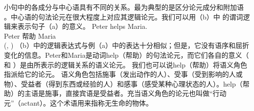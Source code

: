 小句中的各成分与中心语具有不同的关系。最为典型的是区分论元成分和附加语
。中心语的句法论元在很大程度上对应其逻辑论元。我们可以用（b）中
的谓词逻辑来表示句子（a）的意义。
\eal
\ex 
\gll Peter helps Maria.\\
     Peter 帮助 Maria\\
\ex {}(, )
\zl
（b）中的逻辑表达式与例（a）中的表达十分相似；但是，它没有语序和屈折变化的信息。Peter和Maria是动词help（帮助）的句法论元，而它们各自的意义（ 和 ）是由所表示的逻辑关系的语义论元。
我们也可以说help（帮助）将语义角色指派给它的论元。
语义角色包括施事（发出动作的人）、受事（受到影响的人或物）、受益者（得到东西或经验的人）和感事（感受某种心理状态的人）。help（帮助）的主语是施事，直接宾语是受益者。充当语义角色的论元也叫做“行动元”（actant）。这个术语用来指称无生命的物体。

